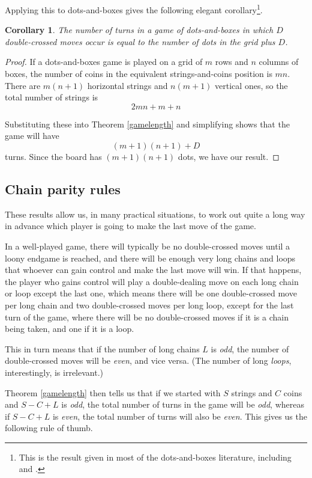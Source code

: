 \documentclass[a4paper,twocolumn]{article}
\newtheorem{dnbgamelength}[thm]{Corollary}
\begin{document}
Applying this to dots-and-boxes gives the following elegant
corollary\footnote{This is the result given in most of the
  dots-and-boxes literature, including \cite{berl} and \cite{wways}.}.

\begin{dnbgamelength}\label{dnbgamelength}
  The number of turns in a game of dots-and-boxes in which $D$
  double-crossed moves occur is equal to the number of dots in the
  grid plus $D$.
\end{dnbgamelength}
\begin{proof}
  If a dots-and-boxes game is played on a grid of $m$ rows and $n$
  columns of boxes, the number of coins in the equivalent
  strings-and-coins position is $mn$. There are $m(n+1)$ horizontal
  strings and $n(m+1)$ vertical ones, so the total number of strings
  is $$2mn + m + n$$

  Substituting these into Theorem \ref{gamelength} and simplifying
  shows that the game will have $$(m+1)(n+1) + D$$ turns.  Since the
  board has $(m+1)(n+1)$ dots, we have our result.
\end{proof}

\subsection{Chain parity rules}

These results allow us, in many practical situations, to work out
quite a long way in advance which player is going to make the last
move of the game.

In a well-played game, there will typically be no double-crossed moves
until a loony endgame is reached, and there will be enough very long
chains and loops that whoever can gain control and make the last move
will win. If that happens, the player who gains control will play a
double-dealing move on each long chain or loop except the last one,
which means there will be one double-crossed move per long chain and
two double-crossed moves per long loop, except for the last turn of
the game, where there will be no double-crossed moves if it is a chain
being taken, and one if it is a loop.

This in turn means that if the number of long chains $L$ is
\emph{odd}, the number of double-crossed moves will be \emph{even},
and vice versa. (The number of long \emph{loops}, interestingly, is
irrelevant.)

Theorem \ref{gamelength} then tells us that if we started with $S$
strings and $C$ coins and $S-C+L$ is \emph{odd}, the total number of
turns in the game will be \emph{odd}, whereas if $S-C+L$ is
\emph{even}, the total number of turns will also be \emph{even}. This
gives us the following rule of thumb.
\end{document}
